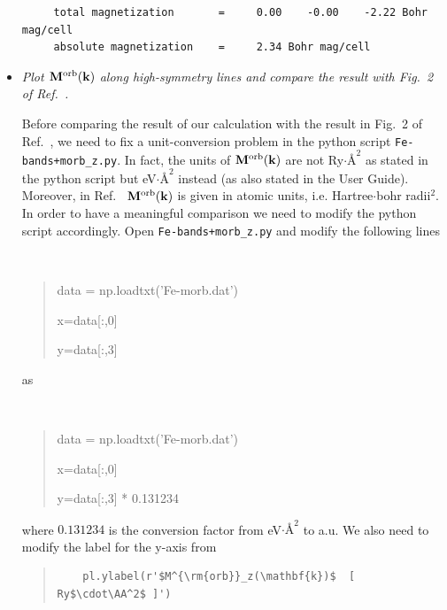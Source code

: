 \begin{itemize}
{\begin{tcolorbox}[title=From Fe.wpout,sharp corners,boxrule=0.5pt]
\begin{verbatim}
\end{verbatim}
\end{tcolorbox}
}

{\small
\begin{tcolorbox}[title=From scf.out,sharp corners,boxrule=0.5pt]
\begin{verbatim}
     total magnetization       =     0.00    -0.00    -2.22 Bohr mag/cell
     absolute magnetization    =     2.34 Bohr mag/cell
\end{verbatim}
\end{tcolorbox}

}

\item {\it Plot $\mathbf{M}^{\mathrm{orb}}(\bfk)$ along high-symmetry lines and compare the result with Fig.~2 of Ref.~.}

Before comparing the result of our calculation with the result in Fig.~2 of Ref.~,  
we need to fix a unit-conversion problem in the python script {\tt Fe-bands+morb\_z.py}. In fact, the units of $\mathbf{M}^{\mathrm{orb}}(\bfk)$ are not Ry$\cdot\si{\angstrom}^2$ as stated in the python script but eV$\cdot\si{\angstrom}^2$ instead (as also stated in the User Guide). Moreover, in Ref.~ $\mathbf{M}^{\mathrm{orb}}(\bfk)$ is given in atomic units, i.e. Hartree$\cdot$bohr radii$^2$. In order to have a meaningful comparison we need to modify the python script accordingly. Open {\tt Fe-bands+morb\_z.py} and modify the following lines
{\tt
\begin{quote}
data = np.loadtxt('Fe-morb.dat')

x=data[:,0]

y=data[:,3]
\end{quote}
}

as 

{\tt
\begin{quote}
data = np.loadtxt('Fe-morb.dat')

x=data[:,0]

y=data[:,3] * 0.131234
\end{quote}
}
where $0.131234$ is the conversion factor from eV$\cdot\si{\angstrom}^2$ to a.u. We also need to modify the label for the y-axis from

\begin{quote}
\begin{verbatim}
	pl.ylabel(r'$M^{\rm{orb}}_z(\mathbf{k})$  [ Ry$\cdot\AA^2$ ]')
\end{verbatim}
\end{quote}


\end{itemize}
